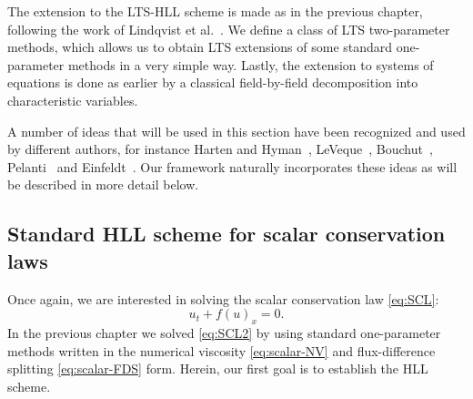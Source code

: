 The extension to the LTS-HLL scheme is made as in the previous chapter, following the work of Lindqvist et al.~\cite{lin16}. We define a class of LTS two-parameter methods, which allows us to obtain LTS extensions of some standard one-parameter methods in a very simple way. Lastly, the extension to systems of equations is done as earlier by a classical field-by-field decomposition into characteristic variables.

A number of ideas that will be used in this section have been recognized and used by different authors, for instance Harten and Hyman~\cite{har83c}, LeVeque~\cite{lev92,lev02}, Bouchut~\cite{bou04}, Pelanti~\cite{pel01} and Einfeldt~\cite{ein88}. Our framework naturally incorporates these ideas as will be described in more detail below.

\subsection{Standard HLL scheme for scalar conservation laws}

Once again, we are interested in solving the scalar conservation law \eqref{eq:SCL}:
\begin{equation} \label{eq:SCL2}
u_t + f(u)_x = 0.
\end{equation}
In the previous chapter we solved \eqref{eq:SCL2} by using standard one-parameter methods written in the numerical viscosity \eqref{eq:scalar-NV} and flux-difference splitting \eqref{eq:scalar-FDS} form. Herein, our first goal is to establish the HLL scheme.

